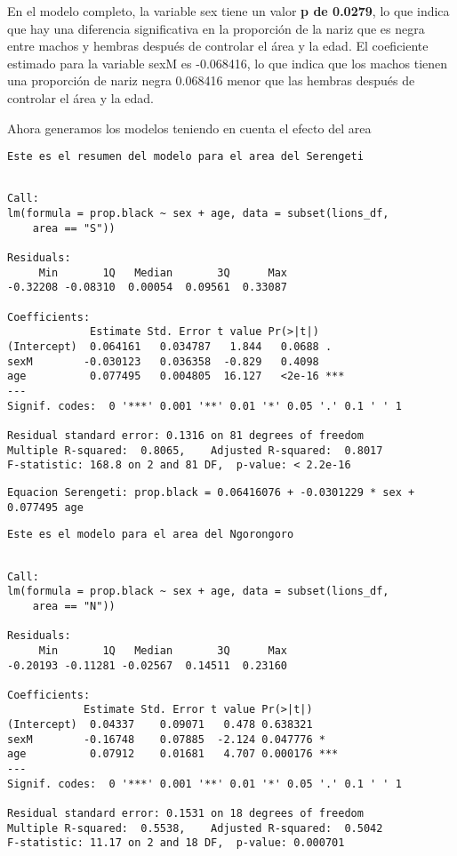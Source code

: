 \documentclass[
]{article}
\begin{document}
En el modelo completo, la variable sex tiene un valor \textbf{p de
0.0279}, lo que indica que hay una diferencia significativa en la
proporción de la nariz que es negra entre machos y hembras después de
controlar el área y la edad. El coeficiente estimado para la variable
sexM es -0.068416, lo que indica que los machos tienen una proporción de
nariz negra 0.068416 menor que las hembras después de controlar el área
y la edad.

Ahora generamos los modelos teniendo en cuenta el efecto del area

\begin{verbatim}
Este es el resumen del modelo para el area del Serengeti
\end{verbatim}

\begin{verbatim}

Call:
lm(formula = prop.black ~ sex + age, data = subset(lions_df, 
    area == "S"))

Residuals:
     Min       1Q   Median       3Q      Max 
-0.32208 -0.08310  0.00054  0.09561  0.33087 

Coefficients:
             Estimate Std. Error t value Pr(>|t|)    
(Intercept)  0.064161   0.034787   1.844   0.0688 .  
sexM        -0.030123   0.036358  -0.829   0.4098    
age          0.077495   0.004805  16.127   <2e-16 ***
---
Signif. codes:  0 '***' 0.001 '**' 0.01 '*' 0.05 '.' 0.1 ' ' 1

Residual standard error: 0.1316 on 81 degrees of freedom
Multiple R-squared:  0.8065,    Adjusted R-squared:  0.8017 
F-statistic: 168.8 on 2 and 81 DF,  p-value: < 2.2e-16
\end{verbatim}

\begin{verbatim}
Equacion Serengeti: prop.black = 0.06416076 + -0.0301229 * sex + 0.077495 age
\end{verbatim}

\begin{verbatim}
Este es el modelo para el area del Ngorongoro
\end{verbatim}

\begin{verbatim}

Call:
lm(formula = prop.black ~ sex + age, data = subset(lions_df, 
    area == "N"))

Residuals:
     Min       1Q   Median       3Q      Max 
-0.20193 -0.11281 -0.02567  0.14511  0.23160 

Coefficients:
            Estimate Std. Error t value Pr(>|t|)    
(Intercept)  0.04337    0.09071   0.478 0.638321    
sexM        -0.16748    0.07885  -2.124 0.047776 *  
age          0.07912    0.01681   4.707 0.000176 ***
---
Signif. codes:  0 '***' 0.001 '**' 0.01 '*' 0.05 '.' 0.1 ' ' 1

Residual standard error: 0.1531 on 18 degrees of freedom
Multiple R-squared:  0.5538,    Adjusted R-squared:  0.5042 
F-statistic: 11.17 on 2 and 18 DF,  p-value: 0.000701
\end{verbatim}
\end{document}
